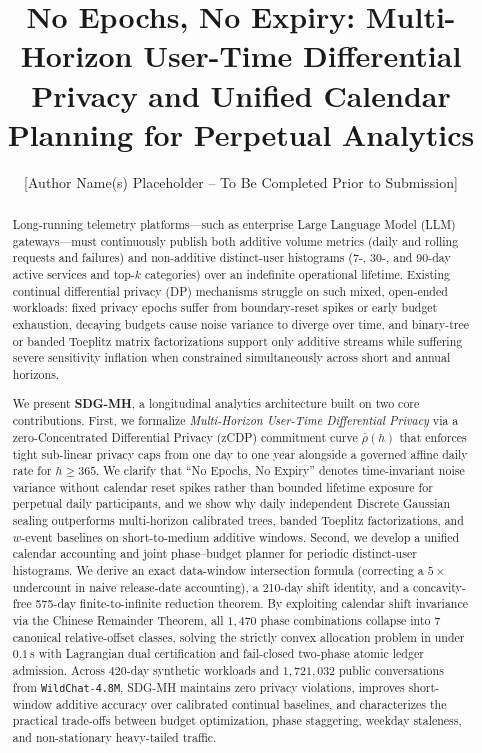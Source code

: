 \documentclass[sigconf, nonacm]{acmart}
\begin{document}
\title[No Epochs, No Expiry: Multi-Horizon User-Time DP for Perpetual Analytics]{No Epochs, No Expiry: Multi-Horizon User-Time Differential Privacy and Unified Calendar Planning for Perpetual Analytics}

\author{[Author Name(s) Placeholder -- To Be Completed Prior to Submission]}

\begin{abstract}
Long-running telemetry platforms---such as enterprise Large Language Model (LLM) gateways---must continuously publish both additive volume metrics (daily and rolling requests and failures) and non-additive distinct-user histograms (7-, 30-, and 90-day active services and top-$k$ categories) over an indefinite operational lifetime. Existing continual differential privacy (DP) mechanisms struggle on such mixed, open-ended workloads: fixed privacy epochs suffer from boundary-reset spikes or early budget exhaustion, decaying budgets cause noise variance to diverge over time, and binary-tree or banded Toeplitz matrix factorizations support only additive streams while suffering severe sensitivity inflation when constrained simultaneously across short and annual horizons.

We present \textbf{SDG-MH}, a longitudinal analytics architecture built on two core contributions. First, we formalize \emph{Multi-Horizon User-Time Differential Privacy} via a zero-Concentrated Differential Privacy (zCDP) commitment curve $\bar{\rho}(h)$ that enforces tight sub-linear privacy caps from one day to one year alongside a governed affine daily rate for $h \ge 365$. We clarify that ``No Epochs, No Expiry'' denotes time-invariant noise variance without calendar reset spikes rather than bounded lifetime exposure for perpetual daily participants, and we show why daily independent Discrete Gaussian sealing outperforms multi-horizon calibrated trees, banded Toeplitz factorizations, and $w$-event baselines on short-to-medium additive windows. Second, we develop a unified calendar accounting and joint phase--budget planner for periodic distinct-user histograms. We derive an exact data-window intersection formula (correcting a $5\times$ undercount in naive release-date accounting), a 210-day shift identity, and a concavity-free 575-day finite-to-infinite reduction theorem. By exploiting calendar shift invariance via the Chinese Remainder Theorem, all $1{,}470$ phase combinations collapse into 7 canonical relative-offset classes, solving the strictly convex allocation problem in under $0.1$\,s with Lagrangian dual certification and fail-closed two-phase atomic ledger admission. Across 420-day synthetic workloads and $1{,}721{,}032$ public conversations from \texttt{WildChat-4.8M}, SDG-MH maintains zero privacy violations, improves short-window additive accuracy over calibrated continual baselines, and characterizes the practical trade-offs between budget optimization, phase staggering, weekday staleness, and non-stationary heavy-tailed traffic.
\end{abstract}
\end{document}
